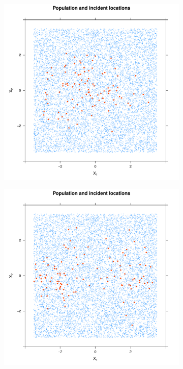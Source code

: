 \begin{figure}[htbp]
    \centering
    \begin{subfigure}{0.45\textwidth}
        \includegraphics[width=\textwidth]{results/unif_100_1_2h_2/output/population_and_incidents_scatter}
        \label{fig:one_sample:p1.4_100_G:2}
    \end{subfigure}
    \begin{subfigure}{0.45\textwidth}
        \includegraphics[width=\textwidth]{results/unif_100_1_2h_4/output/population_and_incidents_scatter}

\end{subfigure}
\end{figure}
